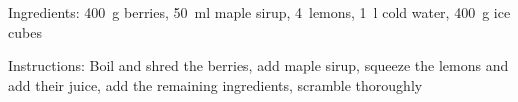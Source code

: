 Ingredients:
400~g berries, 50~ml maple sirup, 4~lemons, 1~l cold water, 400~g ice cubes

\noindent Instructions: Boil and shred the berries, add maple sirup, squeeze the lemons and add their juice, add the remaining ingredients, scramble thoroughly